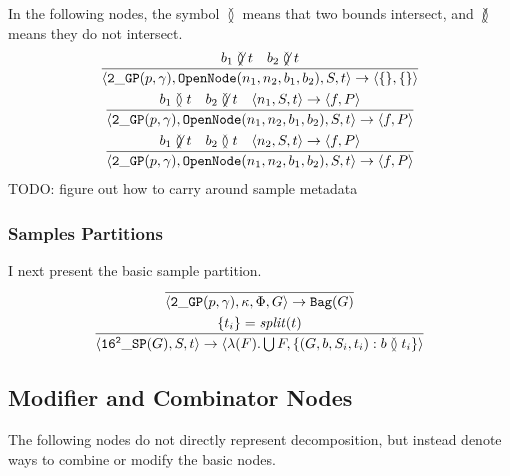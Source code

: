 \documentclass{article}
\newcommand {\sampP}{\mathtt{16^2\_SP}}
\newcommand {\twoGP}{\mathtt{2\_GP}}
\newcommand {\bag}{\mathtt{Bag}}
\newcommand {\twoBox}{\mathtt{OpenNode}}
\newcommand{\isect}{\between}
\newcommand{\nisect}{\not \between}
\begin{document}
In the following nodes, the symbol $\isect$ means that two bounds intersect, and $\nisect$ means they do not intersect.
\begin{gather}
\infer{\langle\twoGP(p, \gamma),\twoBox(n_1,n_2,b_1,b_2), S, t\rangle \to \langle \{\}, \{\} \rangle}{b_1 \nisect t & b_2 \nisect t} 
\\
\infer{\langle\twoGP(p, \gamma),\twoBox(n_1,n_2,b_1,b_2), S, t\rangle \to \langle f, P \rangle}{b_1 \isect t & b_2 \nisect t & \langle n_1, S, t\rangle \to \langle f, P\rangle} 
\\
\infer{\langle\twoGP(p, \gamma),\twoBox(n_1,n_2,b_1,b_2), S, t\rangle \to \langle f, P \rangle}{b_1 \nisect t & b_2 \isect t & \langle n_2, S, t\rangle \to \langle f, P\rangle} 
\end{gather}
TODO: figure out how to carry around sample metadata
\subsubsection{Samples Partitions}
I next present the basic sample partition.
\begin{gather}
\infer{\langle\twoGP(p, \gamma), \kappa, \Phi, G \rangle \to \bag(G)}{}
\\
\infer{\langle\sampP(G), S, t\rangle \to \langle \lambda(F).\bigcup F, \{(G, b, S_i, t_i) : b \isect t_i \}\rangle}{\{t_i\} = \mathit{split}(t)} 
\end{gather}

\subsection{Modifier and Combinator Nodes}
The following nodes do not directly represent decomposition, but instead denote ways to combine or modify the basic nodes.
\end{document}
